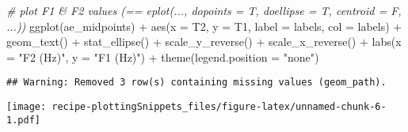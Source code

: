 \documentclass[
]{book}
\newenvironment{Shaded}{\begin{snugshade}}{\end{snugshade}}
\newcommand{\AttributeTok}[1]{\textcolor[rgb]{0.77,0.63,0.00}{#1}}
\newcommand{\CommentTok}[1]{\textcolor[rgb]{0.56,0.35,0.01}{\textit{#1}}}
\newcommand{\FunctionTok}[1]{\textcolor[rgb]{0.00,0.00,0.00}{#1}}
\newcommand{\NormalTok}[1]{#1}
\newcommand{\SpecialCharTok}[1]{\textcolor[rgb]{0.00,0.00,0.00}{#1}}
\newcommand{\StringTok}[1]{\textcolor[rgb]{0.31,0.60,0.02}{#1}}
\begin{document}
\begin{Shaded}
\begin{Highlighting}[]
\CommentTok{\# plot F1 \& F2 values (== eplot(..., dopoints = T, doellipse = T, centroid = F, ...))}
\FunctionTok{ggplot}\NormalTok{(ae\_midpoints) }\SpecialCharTok{+}
  \FunctionTok{aes}\NormalTok{(}\AttributeTok{x =}\NormalTok{ T2, }\AttributeTok{y =}\NormalTok{ T1, }\AttributeTok{label =}\NormalTok{ labels, }\AttributeTok{col =}\NormalTok{ labels) }\SpecialCharTok{+}
  \FunctionTok{geom\_text}\NormalTok{() }\SpecialCharTok{+}
  \FunctionTok{stat\_ellipse}\NormalTok{() }\SpecialCharTok{+}
  \FunctionTok{scale\_y\_reverse}\NormalTok{() }\SpecialCharTok{+} \FunctionTok{scale\_x\_reverse}\NormalTok{() }\SpecialCharTok{+} 
  \FunctionTok{labs}\NormalTok{(}\AttributeTok{x =} \StringTok{"F2 (Hz)"}\NormalTok{, }\AttributeTok{y =} \StringTok{"F1 (Hz)"}\NormalTok{) }\SpecialCharTok{+}
  \FunctionTok{theme}\NormalTok{(}\AttributeTok{legend.position =} \StringTok{"none"}\NormalTok{)}
\end{Highlighting}
\end{Shaded}

\begin{verbatim}
## Warning: Removed 3 row(s) containing missing values (geom_path).
\end{verbatim}

\texttt{[image: recipe-plottingSnippets\_files/figure-latex/unnamed-chunk-6-1.pdf]}
\end{document}
